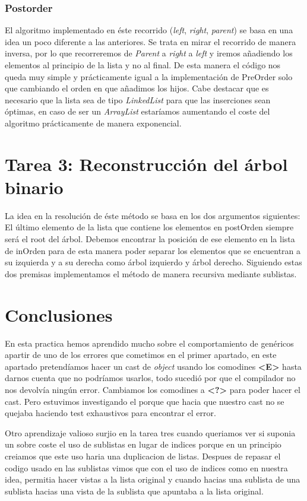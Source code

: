\documentclass{article}
\begin{document}
    \subsubsection{Postorder}
    El algoritmo implementado en éste recorrido (\textit{left}, \textit{right}, \textit{parent})
    se basa en una idea un poco diferente a las anteriores.\newline
    Se trata en mirar el recorrido de manera inversa, por lo que recorreremos de \textit{Parent} a \textit{right} a \textit{left} y iremos añadiendo los elementos al principio de la lista y no al final. De esta manera el código nos queda muy simple y prácticamente igual a la implementación de PreOrder solo que cambiando el orden en que añadimos los hijos.  \newline
    Cabe destacar que es necesario que la lista sea de tipo \textit{LinkedList} para que las inserciones sean óptimas, en caso de ser un \textit{ArrayList} estaríamos aumentando el coste del algoritmo prácticamente de manera exponencial.


    \section{Tarea 3: Reconstrucción del árbol binario}
    La idea en la resolución de éste método se basa en los dos argumentos siguientes:
    \newline
    El último elemento de la lista que contiene los elementos en postOrden siempre será el root del árbol.
    \newline
    Debemos encontrar la posición de ese elemento en la lista de inOrden para de esta manera poder separar los elementos que se encuentran a su izquierda y a su derecha como árbol izquierdo y árbol derecho.
    \newline
    Siguiendo estas dos premisas implementamos el método de manera recursiva mediante sublistas.

    \section{Conclusiones}
    En esta practica hemos aprendido mucho sobre el comportamiento de genéricos
    apartir de uno de los errores que cometimos en el primer apartado, en este
    apartado pretendíamos hacer un cast de \textit{object} usando los comodines
    \textbf{<E>} hasta darnos cuenta que no podríamos usarlos, todo sucedió por que
    el compilador no nos devolvía ningún error. Cambiamos los comodines a
    \textbf{<?>} para poder hacer el cast. Pero estuvimos investigando el porque que
    hacia que nuestro cast no se quejaba haciendo test exhaustivos para encontrar el
    error.

    Otro aprendizaje valioso surjio en la tarea tres cuando queriamos ver si suponia
    un sobre coste el uso de sublistas en lugar de indices porque en un principio
    creiamos que este uso haria una duplicacion de listas. Despues de repasar el
    codigo usado en las sublistas vimos que con el uso de indices como en nuestra
    idea, permitia hacer vistas a la lista original y cuando hacias una sublista de
    una sublista hacias una vista de la sublista que apuntaba a la lista original.
\end{document}
